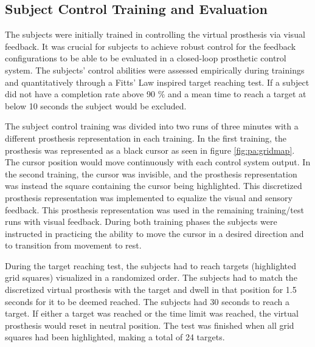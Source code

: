 \subsection{Subject Control Training and Evaluation} \label{sec:pa:subjectcontrol}
The subjects were initially trained in controlling the virtual prosthesis via visual feedback. It was crucial for subjects to achieve robust control for the feedback configurations to be able to be evaluated in a closed-loop prosthetic control system. The subjects' control abilities were assessed empirically during trainings and quantitatively through a Fitts' Law inspired target reaching test. If a subject did not have a completion rate above 90 $\%$ and a mean time to reach a target at below 10 seconds the subject would be excluded. 

The subject control training was divided into two runs of three minutes with a different prosthesis representation in each training. In the first training, the prosthesis was represented as a black cursor as seen in figure \ref{fig:pa:gridmap}. The cursor position would move continuously with each control system output. In the second training, the cursor was invisible, and the prosthesis representation was instead the square containing the cursor being highlighted. This discretized prosthesis representation was implemented to equalize the visual and sensory feedback. This prosthesis representation was used in the remaining training/test runs with visual feedback. During both training phases the subjects were instructed in practicing the ability to move the cursor in a desired direction and to transition from movement to rest. 

During the target reaching test, the subjects had to reach targets (highlighted grid squares) visualized in a randomized order. The subjects had to match the discretized virtual prosthesis with the target and dwell in that position for 1.5 seconds for it to be deemed reached. The subjects had 30 seconds to reach a target. If either a target was reached or the time limit was reached, the virtual prosthesis would reset in neutral position. The test was finished when all grid squares had been highlighted, making a total of 24 targets. 
